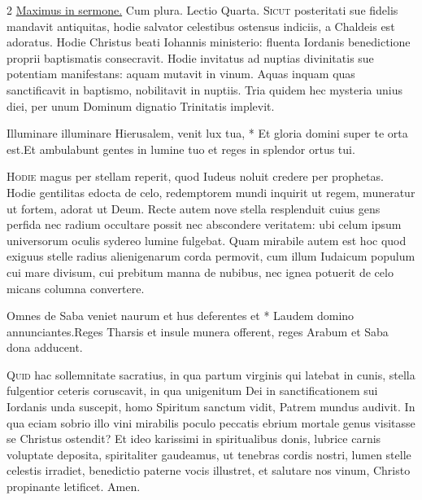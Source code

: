 \begin{multicols*}{2}
\newline \ul{Maximus in sermone.} Cum plura. {\color{Red} Lectio Quarta.} \grecross
\lettrine[lines=2]{\zallmancaps \color{Blue} S}{icut} posteritati sue fidelis mandavit antiquitas, hodie salvator celestibus ostensus indiciis, a Chaldeis est adoratus. Hodie Christus beati Iohannis ministerio: fluenta Iordanis benedictione proprii baptismatis consecravit. Hodie invitatus ad nuptias divinitatis sue potentiam manifestans: aquam mutavit in vinum. Aquas inquam quas sanctificavit in baptismo, nobilitavit in nuptiis. Tria quidem hec mysteria unius diei, per unum Dominum dignatio Trinitatis implevit.
\begin{responsory}
{Illuminare illuminare Hierusalem, venit lux tua, * Et gloria domini super te orta est.}{Et ambulabunt gentes in lumine tuo et reges in splendor ortus tui.}
\end{responsory}%
\lettrine[lines=2]{\zallmancaps \color{Red} H}{odie} magus per stellam reperit, quod Iudeus noluit credere per prophetas. Hodie gentilitas edocta de celo,
redemptorem mundi inquirit ut regem, muneratur ut fortem, adorat ut Deum. Recte autem nove stella resplenduit cuius gens perfida nec radium occultare possit nec abscondere veritatem: ubi celum ipsum universorum oculis sydereo lumine fulgebat. Quam mirabile autem est hoc quod exiguus stelle radius alienigenarum corda permovit, cum illum Iudaicum populum cui mare divisum, cui prebitum manna de nubibus, nec ignea potuerit de celo micans columna convertere.
\begin{responsory}
{Omnes de Saba veniet naurum et hus deferentes et * Laudem domino annunciantes.}{Reges Tharsis et insule munera offerent, reges Arabum et Saba dona adducent.}
\end{responsory}%
\lettrine[lines=2]{\zallmancaps \color{Blue} Q}{uid} hac sollemnitate sacratius, in qua partum virginis qui latebat in cunis, stella fulgentior ceteris coruscavit, in qua unigenitum Dei in sanctificationem sui Iordanis unda suscepit, homo Spiritum sanctum vidit, Patrem mundus audivit. In qua eciam sobrio illo vini mirabilis poculo peccatis ebrium mortale genus visitasse se Christus ostendit? Et ideo karissimi in spiritualibus donis, lubrice carnis voluptate deposita, spiritaliter gaudeamus, ut tenebras cordis nostri, lumen stelle celestis irradiet, benedictio paterne vocis illustret, et salutare nos vinum, Christo propinante letificet. Amen.

\end{multicols*}
